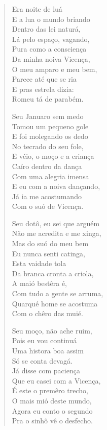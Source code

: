\begin{verse}
Era noite de luá\\
E a lua o mundo briando\\
Dentro das lei naturá,\\
Lá pelo espaço, vagando,\\
Pura como a consciença\\
Da minha noiva Vicença,\\
O meu amparo e meu bem,\\
Parece até que se ria\\
E pras estrela dizia:\\
Romeu tá de parabém.

Seu Januaro sem medo\\
Tomou um pequeno gole\\
E foi molegando os dedo\\
No tecrado do seu fole,\\
E véio, o moço e a criança\\
Caíro dentro da dança\\
Com uma alegria imensa\\
E eu com a noiva dançando,\\
Já ia me acostumando\\
Com o suó de Vicença.

Seu dotô, eu sei que arguém\\
Não me acredita e me xinga,\\
Mas do suó do meu bem\\
Eu nunca senti catinga,\\
Esta vaidade tola\\
Da branca cronta a criola,\\
A maió bestêra é,\\
Com tudo a gente se arruma,\\
Quarqué home se acostuma\\
Com o chêro das muié.

Seu moço, não ache ruim,\\
Pois eu vou continuá\\
Uma histora boa assim\\
Só se conta devagá.\\
Já disse com paciença\\
Que eu casei com a Vicença,\\
É este o premêro trecho,\\
O mais mió deste mundo,\\
Agora eu conto o segundo\\
Pra o sinhô vê o desfecho.


\end{verse}
